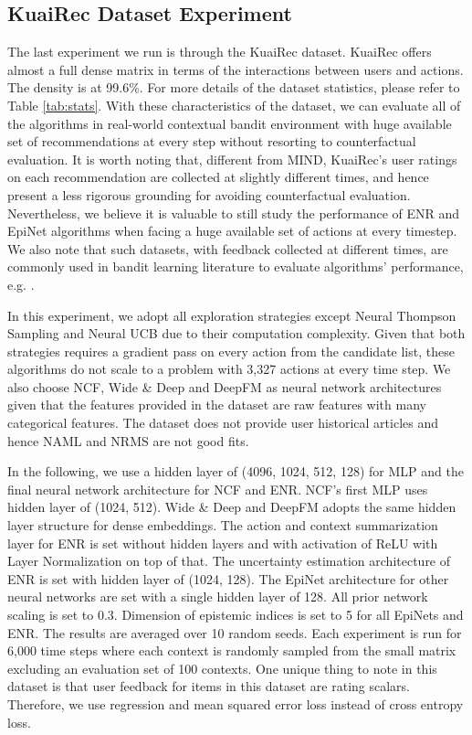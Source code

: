 \subsection{KuaiRec Dataset Experiment \cite{gao2022kuairec}}
The last experiment we run is through the KuaiRec dataset. KuaiRec offers almost a full dense matrix in terms of the interactions between users and actions. The density is at 99.6\%. For more details of the dataset statistics, please refer to Table \ref{tab:stats}. With these characteristics of the dataset, we can evaluate all of the algorithms in real-world contextual bandit environment with huge available set of recommendations at every step without resorting to counterfactual evaluation. It is worth noting that, different from MIND, KuaiRec's user ratings on each recommendation are collected at slightly different times, and hence present a less rigorous grounding for avoiding counterfactual evaluation. Nevertheless, we believe it is valuable to still study the performance of ENR and EpiNet algorithms when facing a huge available set of actions at every timestep. We also note that such datasets, with feedback collected at different times, are commonly used in bandit learning literature to evaluate algorithms' performance, e.g. \cite{chris2018learning, hong2020latent, zhang2020conversational}.

In this experiment, we adopt all exploration strategies except Neural Thompson Sampling and Neural UCB due to their computation complexity. Given that both strategies requires a gradient pass on every action from the candidate list, these algorithms do not scale to a problem with 3,327 actions at every time step. We also choose NCF, Wide \& Deep and DeepFM as neural network architectures given that the features provided in the dataset are raw features with many categorical features. The dataset does not provide user historical articles and hence NAML and NRMS are not good fits.

In the following, we use a hidden layer of (4096, 1024, 512, 128) for MLP and the final neural network architecture for NCF and ENR. NCF's first MLP uses hidden layer of (1024, 512). Wide \& Deep and DeepFM adopts the same hidden layer structure for dense embeddings. The action and context summarization layer for ENR is set without hidden layers and with activation of ReLU with Layer Normalization on top of that. The uncertainty estimation architecture of ENR is set with hidden layer of (1024, 128). The EpiNet architecture for other neural networks are set with a single hidden layer of 128. All prior network scaling is set to 0.3. Dimension of epistemic indices is set to 5 for all EpiNets and ENR. The results are averaged over 10 random seeds. Each experiment is run for 6,000 time steps where each context is randomly sampled from the small matrix excluding an evaluation set of 100 contexts. One unique thing to note in this dataset is that user feedback for items in this dataset are rating scalars. Therefore, we use regression and mean squared error loss instead of cross entropy loss.

